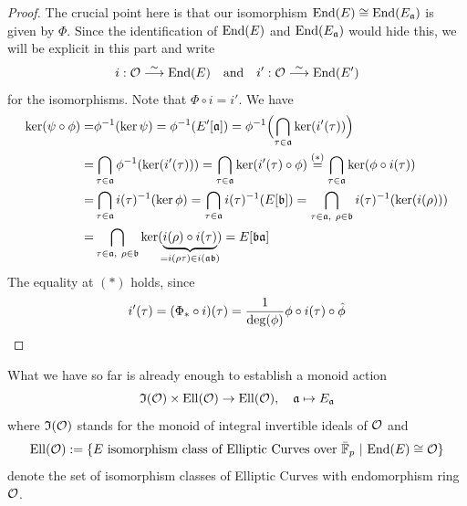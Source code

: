 \begin{proof}
    The crucial point here is that our isomorphism $\mathrm{End}(E) \cong \mathrm{End}(E_{\mathfrak{a}})$ is given by $\Phi$.
    Since the identification of $\mathrm{End}(E)$ and $\mathrm{End}(E_{\mathfrak{a}})$ would hide this, we will be explicit in this part and write
    \begin{align*}
        i: \mathcal{O} \overset{\sim}{\longrightarrow} \mathrm{End}(E) \quad \text{and} \quad i': \mathcal{O} \overset{\sim}{\longrightarrow} \mathrm{End}(E')
    \end{align*}
    for the isomorphisms.
    Note that $\Phi \circ i = i'$.
    We have
    \begin{align*}
        \ker(\psi \circ \phi) =& \phi^{-1}(\ker\psi) = \phi^{-1}(E'[\mathfrak{a}]) = \phi^{-1}\Bigl( \bigcap_{\tau \in \mathfrak{a}} \ker(i'(\tau)) \Bigr) \\
        =& \bigcap_{\tau \in \mathfrak{a}} \phi^{-1}(\ker(i'(\tau))) = \bigcap_{\tau \in \mathfrak{a}} \ker(i'(\tau) \circ \phi) \overset{(*)}{=} \bigcap_{\tau \in \mathfrak{a}} \ker(\phi \circ i(\tau)) \\
        =& \bigcap_{\tau \in \mathfrak{a}} i(\tau)^{-1}(\ker\phi) = \bigcap_{\tau \in \mathfrak{a}} i(\tau)^{-1}(E[\mathfrak{b}]) = \bigcap_{\tau \in \mathfrak{a}, \ \rho \in \mathfrak{b}} i(\tau)^{-1}(\ker(i(\rho))) \\
        =& \bigcap_{\tau \in \mathfrak{a}, \ \rho \in \mathfrak{b}} \ker(\underbrace{i(\rho) \circ i(\tau)}_{\mathclap{= i(\rho\tau) \in i(\a\b)}}) = E[\mathfrak{b}\mathfrak{a}]
    \end{align*}
    The equality at $(*)$ holds, since
    \begin{equation*}
        i'(\tau) = (\Phi_* \circ i)(\tau) = \frac 1 {\deg(\phi)} \phi \circ i(\tau) \circ \hat{\phi} \qedhere
    \end{equation*}
\end{proof}
What we have so far is already enough to establish a monoid action
\begin{equation*}
    \mathfrak{I}(\mathcal{O}) \times \mathrm{Ell}(\mathcal{O}) \to \mathrm{Ell}(\mathcal{O}), \quad \mathfrak{a} \mapsto E_{\mathfrak{a}}
\end{equation*}
where $\mathfrak{I}(\mathcal{O})$ stands for the monoid of integral invertible ideals of $\mathcal{O}$ and
\begin{equation*}
    \mathrm{Ell}(\mathcal{O}) := \{ \text{$E$ isomorphism class of Elliptic Curves over $\bar{\mathbb{F}}_p$} \ | \ \mathrm{End}(E) \cong \mathcal{O} \}
\end{equation*}
denote the set of isomorphism classes of Elliptic Curves with endomorphism ring $\mathcal{O}$.

